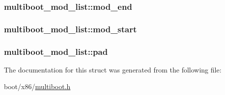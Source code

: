 \subsubsection[{mod\+\_\+end}]{ multiboot\+\_\+mod\+\_\+list\+::mod\+\_\+end}\label{structmultiboot__mod__list_a75b0899f1e1f90d4ff629b7136f5b988}
\hypertarget{structmultiboot__mod__list_afe0e2af1e8c0297c17a7771bd1a62e0f}{}
\subsubsection[{mod\+\_\+start}]{ multiboot\+\_\+mod\+\_\+list\+::mod\+\_\+start}\label{structmultiboot__mod__list_afe0e2af1e8c0297c17a7771bd1a62e0f}
\hypertarget{structmultiboot__mod__list_a63d98e6d313098a4d35b828e204a4e0c}{}
\subsubsection[{pad}]{ multiboot\+\_\+mod\+\_\+list\+::pad}\label{structmultiboot__mod__list_a63d98e6d313098a4d35b828e204a4e0c}


The documentation for this struct was generated from the following file\+:\begin{DoxyCompactItemize}
\item 
boot/x86/\hyperlink{multiboot_8h}{multiboot.\+h}\end{DoxyCompactItemize}
